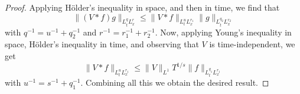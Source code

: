 \documentclass[11pt,a4paper]{scrartcl}
\begin{document}
\begin{proof}
  Applying H\"older's inequality in space, and then in time, we find that
  \begin{displaymath}
    \| (V * f) g \|_{L_t^q L_x^r} \le \| V * f \|_{L_t^u L_x^{r_1}} \| g
    \|_{L_t^{q_2} L_x^{r_2}}
  \end{displaymath}
  with $q^{-1} = u^{-1} + q_2^{-1}$ and $r^{-1} = r_1^{-1} + r_2^{-1}$. Now,
  applying Young's inequality in space, H\"older's inequality in time, and
  observing that $V$ is time-independent, we get
  \begin{displaymath}
    \| V * f \|_{L_t^u L_x^{r_1}} \le \| V \|_{L^1} T^{1/s} \| f \|_{L_t^{q_1}
    L_x^{r_1}}
  \end{displaymath}
  with $u^{-1} = s^{-1} + q_1^{-1}$. Combining all this we obtain the desired
  result.
\end{proof}
\end{document}
